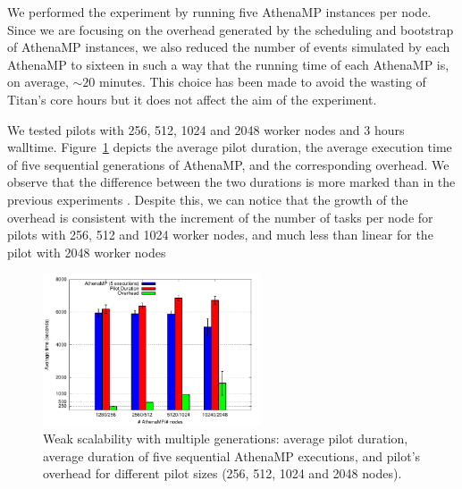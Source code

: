 We performed the experiment by running five AthenaMP instances per node. %
Since we are focusing on the overhead generated by the scheduling and bootstrap of AthenaMP instances, we also reduced  the number of events simulated by each AthenaMP to sixteen in such a way that the running time of each AthenaMP is, on average, $\sim 20$ minutes.
This choice has been made to avoid the wasting of Titan's core hours but it does not affect the aim of the experiment.  

We tested
pilots
with 256, 512, 1024 and 2048 worker nodes and
3 hours walltime. Figure~\ref{fig:weakScal2a} depicts the average
pilot duration, the average execution time of five sequential
generations of AthenaMP, and the corresponding overhead. We
observe that the difference between the two durations is more marked than in the
previous experiments . Despite this, we can notice that the growth of the overhead is consistent with the increment of the number of tasks per node for pilots with 256, 512 and 1024 worker nodes, and much less than linear for the pilot with 2048 worker nodes  

\begin{figure}[!htb]
        \includegraphics[height=4.5cm,width=\columnwidth]{./figures/NGE/weak2.pdf}
    \caption{Weak scalability with multiple generations: average pilot
    duration, average duration of five sequential AthenaMP executions, and
    pilot's overhead for different pilot sizes (256, 512, 1024 and 2048 nodes).}
\label{fig:weakScal2a}
\end{figure}

